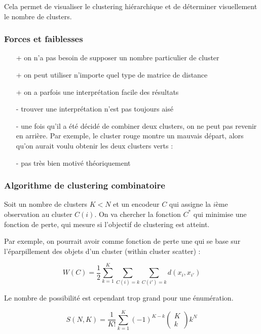 		Cela permet de visualiser le clustering hiérarchique et de déterminer visuellement le nombre de clusters.
		
		
		
		\subsubsection{Forces et faiblesses}
		
		\begin{itemize}
			\item[+] on n'a pas besoin de supposer un nombre particulier de cluster
			\item[+] on peut utiliser n'importe quel type de matrice de distance
			\item[+] on a parfois une interprétation facile des résultats
			
			\item[-] trouver une interprétation n'est pas toujours aisé
			\item[-] une fois qu'il a été décidé de combiner deux clusters, on ne peut pas revenir en arrière. Par exemple, le cluster rouge montre un mauvais départ, alors qu'on aurait voulu obtenir les deux clusters verts :
			
			\item[-] pas très bien motivé théoriquement
		\end{itemize}
		
		\subsubsection{Algorithme de clustering combinatoire}
		
		Soit un nombre de clusters $K < N$ et un encodeur $C$ qui assigne la $i$ème observation au cluster $C(i)$. On va chercher la fonction $C^*$ qui minimise une fonction de perte, qui mesure si l'objectif de clustering est atteint.
		
		Par exemple, on pourrait avoir comme fonction de perte une qui se base sur l'éparpillement des objets d'un cluster (within cluster scatter) :
		
		$$W(C) = \frac{1}{2} \sum_{k = 1}^K \sum_{C(i) = k} \sum_{C(i') = k} d(x_i, x_{i'})$$
		
		Le nombre de possibilité est cependant trop grand pour une énumération.
		
		$$S(N, K) = \frac{1}{K!} \sum_{k = 1}^K(-1)^{K - k} \begin{pmatrix}
		K \\ 
		k
		\end{pmatrix}  k^N$$
	
